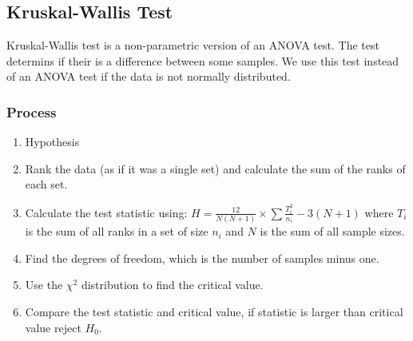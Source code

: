     \subsection{Kruskal-Wallis Test}
        Kruskal-Wallis test is a non-parametric version of an ANOVA test. The test determins if their is a difference between some samples. We use this test instead of an ANOVA test if the data is not normally distributed.

        \subsubsection{Process}
            \begin{enumerate}
            \item Hypothesis
            \item Rank the data (as if it was a single set) and calculate the sum of the ranks of each set.
            \item Calculate the test statistic using: $H = \displaystyle\frac{12}{N(N + 1)} \times \displaystyle\sum{\frac{T_i^2}{n_i}} - 3(N + 1)$ where $T_i$ is the sum of all ranks in a set of size $n_i$ and $N$ is the sum of all sample sizes.
            \item Find the degrees of freedom, which is the number of samples minus one.
            \item Use the $\chi^2$ distribution to find the critical value.
            \item Compare the test statistic and critical value, if statistic is larger than critical value reject $H_0$.
            \end{enumerate}

